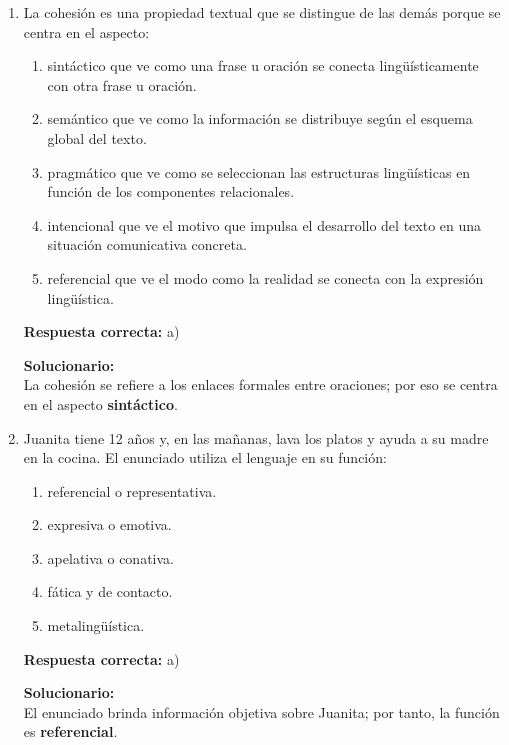 \begin{enumerate}
	\item La cohesión es una propiedad textual que se distingue de las demás porque se centra en el aspecto:
	\begin{enumerate}[label=\alph*)]
		\item sintáctico que ve como una frase u oración se conecta lingüísticamente con otra frase u oración.
		\item semántico que ve como la información se distribuye según el esquema global del texto.
		\item pragmático que ve como se seleccionan las estructuras lingüísticas en función de los componentes relacionales.
		\item intencional que ve el motivo que impulsa el desarrollo del texto en una situación comunicativa concreta.
		\item referencial que ve el modo como la realidad se conecta con la expresión lingüística.
	\end{enumerate}
	\textbf{Respuesta correcta:} a)
	
	\vspace{2mm}
	\textbf{Solucionario:}\\
	La cohesión se refiere a los enlaces formales entre oraciones; por eso se centra en el aspecto \textbf{sintáctico}.
	
	\vspace{6mm}
	
	\item Juanita tiene 12 años y, en las mañanas, lava los platos y ayuda a su madre en la cocina. El enunciado utiliza el lenguaje en su función:
	\begin{enumerate}[label=\alph*)]
		\item referencial o representativa.
		\item expresiva o emotiva.
		\item apelativa o conativa.
		\item fática y de contacto.
		\item metalingüística.
	\end{enumerate}
	\textbf{Respuesta correcta:} a)
	
	\vspace{2mm}
	\textbf{Solucionario:}\\
	El enunciado brinda información objetiva sobre Juanita; por tanto, la función es \textbf{referencial}.
	
	\vspace{6mm}
	
\end{enumerate}

